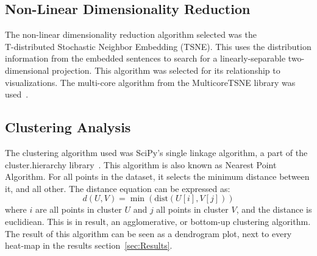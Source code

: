 \subsection{Non-Linear Dimensionality Reduction}\label{sub:Non-Linear Dimentionality Reduction}
The non-linear dimensionality reduction algorithm selected was the \\ T-distributed Stochastic Neighbor Embedding (TSNE). This uses the distribution information from the embedded sentences to search for a linearly-separable two-dimensional projection. This algorithm was selected for its relationship to visualizations. The multi-core algorithm from the MulticoreTSNE library was used~\cite{ulyanov2016tsne}.


\subsection{Clustering Analysis}\label{sub:Clustering Analysis}
The clustering algorithm used was SciPy's single linkage algorithm, a part of the cluster.hierarchy library~\cite{scipy2020}. This algorithm is also known as Nearest Point Algorithm. For all points in the dataset, it selects the minimum distance between it, and all other. The distance equation can be expressed as:
\begin{equation}
  d(U,V) = \min(\text{dist} (U[i], V[j]))
\end{equation}
where $i$ are all points in cluster $U$ and $j$ all points in cluster $V$, and the distance is euclidiean.
This is in result, an agglomerative, or bottom-up clustering algorithm. The result of this algorithm can be seen as a dendrogram plot, next to every heat-map in the results section~\ref{sec:Results}.
